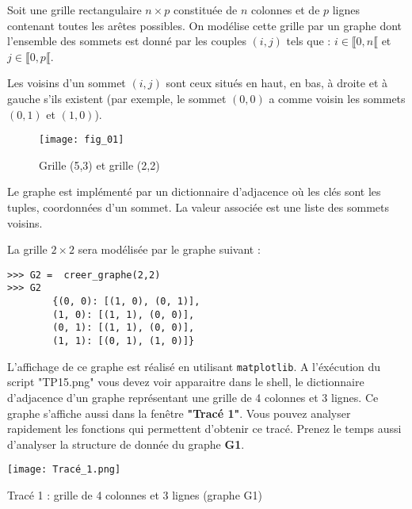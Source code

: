 Soit une grille rectangulaire $n\times p$ constituée de $n$ colonnes et de $p$ lignes contenant toutes les arêtes possibles. On modélise cette grille par un graphe dont l'ensemble des sommets est donné par les couples $(i,j)$ tels que : $i\in\llbracket 0,n \llbracket $ et $j\in\llbracket 0,p \llbracket $.

Les voisins d'un sommet $(i,j)$ sont ceux situés en haut, en bas, à droite et à gauche s'ils existent (par exemple, le sommet $(0,0)$ a comme voisin les sommets $(0,1)$ et $(1,0)$).



\begin{figure}[!h]\centering
\texttt{[image: fig\_01]}
\caption{Grille (5,3) et grille (2,2)}
\end{figure}

Le graphe est implémenté par un dictionnaire d'adjacence où les clés sont les tuples, coordonnées d'un sommet. La valeur associée est une liste des sommets voisins. 

\begin{exemple}
La grille $ 2 \times 2$ sera modélisée par le graphe suivant :

\begin{lstlisting}
>>> G2 =  creer_graphe(2,2)
>>> G2
        {(0, 0): [(1, 0), (0, 1)],
        (1, 0): [(1, 1), (0, 0)],
        (0, 1): [(1, 1), (0, 0)],
        (1, 1): [(0, 1), (1, 0)]}
\end{lstlisting}
\end{exemple}

L'affichage de ce graphe est réalisé en utilisant \texttt{matplotlib}.
A l'éxécution du script "TP15.png" vous devez voir apparaitre dans le shell, le dictionnaire d'adjacence d'un graphe représentant une grille de 4 colonnes et 3 lignes.
Ce graphe s'affiche aussi dans la fenêtre\textbf{ "Tracé 1"}. Vous pouvez analyser rapidement les fonctions qui permettent d'obtenir ce tracé. Prenez le temps aussi d'analyser la structure de donnée du graphe \textbf{G1}.

\begin{marginfigure}
\texttt{[image: Tracé\_1.png]}
\caption{Tracé 1 : grille de 4 colonnes et 3 lignes (graphe G1)}
\end{marginfigure}




